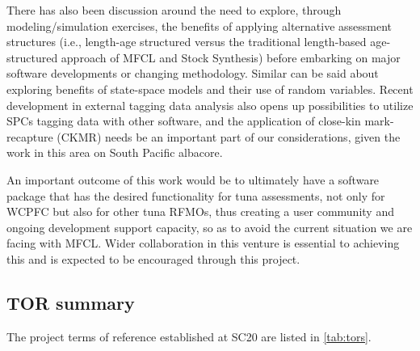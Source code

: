 \documentclass{SCreport}
\begin{document}
There has also been discussion around the need to explore, through
modeling/simulation exercises, the benefits of applying alternative assessment
structures (i.e., length-age structured versus the traditional length-based
age-structured approach of MFCL and Stock Synthesis) before embarking on major
software developments or changing methodology. Similar can be said about
exploring benefits of state-space models and their use of random variables.
Recent development in external tagging data analysis also opens up possibilities
to utilize SPCs tagging data with other software, and the application of
close-kin mark-recapture (CKMR) needs be an important part of our
considerations, given the work in this area on South Pacific albacore.

An important outcome of this work would be to ultimately have a software package
that has the desired functionality for tuna assessments, not only for WCPFC but
also for other tuna RFMOs, thus creating a user community and ongoing
development support capacity, so as to avoid the current situation we are facing
with MFCL. Wider collaboration in this venture is essential to achieving this
and is expected to be encouraged through this project.

\vspace{1ex}

\subsection{TOR summary}

The project terms of reference established at SC20 are listed in
\autoref{tab:tors}.

\newpage
\end{document}
